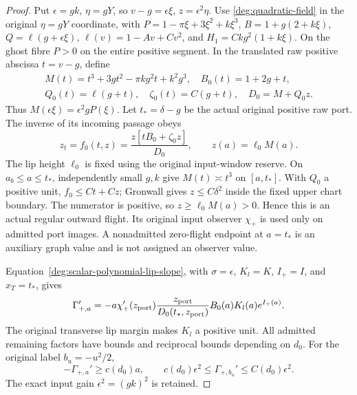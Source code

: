 \begin{proof}
Put \(\epsilon=gk\), \(\eta=gY\), so
\(v-g=\epsilon\xi\), \(z=\epsilon^2\eta\). Use \eqref{deg:quadratic-field} in the original
\(\eta=gY\) coordinate, with \(P=1-\pi\xi+3\xi^2+k\xi^3\),
\(B=1+g(2+k\xi)\), \(Q=\ell(g+\epsilon\xi)\),
\(\ell(v)=1-Av+Cv^2\), and \(H_1=Ckg^2(1+k\xi)\).
On the ghost fibre \(P>0\) on the entire positive segment. In the
translated raw positive abscissa \(t=v-g\), define
\[
 \begin{gathered}
 M(t)=t^3+3gt^2-\pi kg^2t+k^2g^3,\quad B_0(t)=1+2g+t,\\
 Q_0(t)=\ell(g+t),\quad\zeta_0(t)=C(g+t),\quad D_0=M+Q_0z.
 \end{gathered}
\]
Thus \(M(\epsilon\xi)=\epsilon^2gP(\xi)\).
Let \(t_*=\delta-g\) be the actual original positive raw port.
The inverse of its incoming passage obeys
\begin{equation}\label{bp-tail:positive-raw-graph}
 z_t=f_0(t,z)=\frac{z[tB_0+\zeta_0z]}{D_0},\qquad
                         z(a)=\ell_0M(a).
\end{equation}
The lip height \(\ell_0\) is fixed using the original input-window
reserve. On \(a_b\le a\le t_*\), independently small \(g,k\) give
\(M(t)\asymp t^3\) on \([a,t_*]\). With \(Q_0\) a positive unit,
\(f_0\le Ct+Cz\); Gronwall gives \(z\le C\delta^2\) inside the
fixed upper chart boundary. The numerator is positive, so
\(z\ge\ell_0M(a)>0\). Hence this is an actual regular
outward flight. Its original input observer \(\chi_+\) is used only
on admitted port images. A nonadmitted zero-flight endpoint at \(a=t_*\)
is an auxiliary graph value and is not assigned an observer value.

Equation~\eqref{deg:scalar-polynomial-lip-slope}, with
\(\sigma=\epsilon\), \(K_l=K\), \(I_+=I\), and \(x_T=t_*\), gives
\begin{equation}\label{bp-tail:positive-full-gain}
 \Gamma_{+,a}'=-a\chi_+'(z_{\rm port})\frac{z_{\rm port}}{D_0(t_*,z_{\rm port})}
                     B_0(a)K_l(a)e^{I_+(a)}.
\end{equation}
The original transverse lip margin makes \(K_l\) a positive unit.
All admitted remaining factors have bounds and reciprocal bounds
depending on \(d_0\). For the original label \(b_u=-u^2/2\),
\begin{equation}\label{bp-tail:positive-raw-slope}
 -\Gamma_{+,a}'\ge c(d_0)a,\qquad
 c(d_0)\epsilon^2\le\Gamma_{+,b_u}'\le C(d_0)\epsilon^2.
\end{equation}
The exact input gain \(\epsilon^2=(gk)^2\) is retained.


\end{proof}
